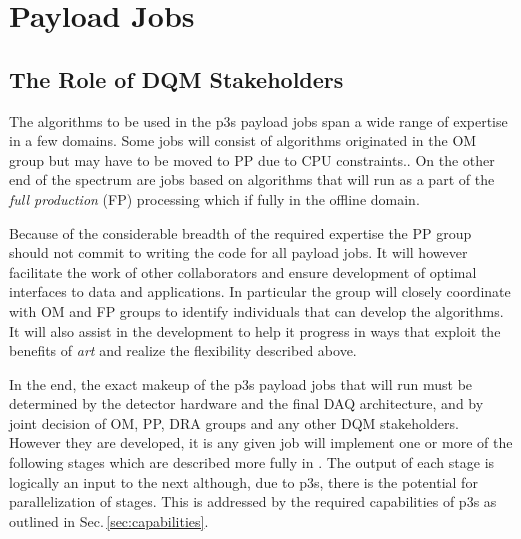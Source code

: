 \documentclass[pdftex,12pt,letter]{article}
\begin{document}
\section{Payload Jobs}
\label{sec:categories}

\subsection{The Role of DQM Stakeholders}
The algorithms to be used in the p3s payload jobs span a wide
range of expertise in a few domains.  Some jobs will consist of algorithms
originated in the OM group but may have to be moved to PP due
to CPU constraints..
On the other end of the spectrum
are jobs based on algorithms that will run as a part
of the \textit{full production} (FP) processing which if fully in the
offline domain.

Because of the considerable breadth of the required expertise the
PP group should not commit to writing the code for all payload jobs. 
It will however facilitate the work of other
collaborators and ensure development of optimal interfaces
to data and applications.  In particular the group will closely
coordinate with OM and FP groups to identify individuals that can
develop the algorithms.  It will also assist in the development to
help it progress in ways that exploit the benefits of \textit{art} and
realize the flexibility described above.

In the end, the exact makeup of the p3s payload jobs that will run
must be determined by the detector hardware and the final DAQ
architecture, and by joint decision of OM, PP, DRA groups and
any other DQM stakeholders.  However they are
developed, it is any given job will implement one or more of the
following stages which are described more fully in \cite{docdb1811}.
The output of each stage is logically an input to the next although,
due to p3s, there is the potential for parallelization of stages. This is
addressed by the required capabilities of p3s as outlined in
Sec.\,\ref{sec:capabilities}.
\end{document}
